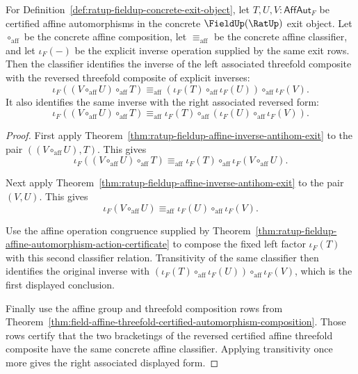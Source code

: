 \begin{theorem}
\label{thm:ratup-fieldup-affine-threefold-inverse-antihom-exit}
For Definition~\ref{def:ratup-fieldup-concrete-exit-object}, let
$T,U,V:\mathsf{AffAut}_F$ be certified affine automorphisms in the concrete
$\FieldUp(\RatUp)$ exit object. Let $\circ_{\mathrm{aff}}$ be the concrete
affine composition, let $\equiv_{\mathrm{aff}}$ be the concrete affine
classifier, and let $\iota_F(-)$ be the explicit inverse operation supplied by
the same exit rows. Then the classifier identifies the inverse of the left
associated threefold composite with the reversed threefold composite of
explicit inverses:
$$
\iota_F((V\circ_{\mathrm{aff}}U)\circ_{\mathrm{aff}}T)
\equiv_{\mathrm{aff}}
(\iota_F(T)\circ_{\mathrm{aff}}\iota_F(U))
\circ_{\mathrm{aff}}\iota_F(V).
$$
It also identifies the same inverse with the right associated reversed form:
$$
\iota_F((V\circ_{\mathrm{aff}}U)\circ_{\mathrm{aff}}T)
\equiv_{\mathrm{aff}}
\iota_F(T)\circ_{\mathrm{aff}}
(\iota_F(U)\circ_{\mathrm{aff}}\iota_F(V)).
$$
\end{theorem}
\begin{proof}
First apply Theorem~\ref{thm:ratup-fieldup-affine-inverse-antihom-exit} to the
pair $((V\circ_{\mathrm{aff}}U),T)$. This gives
$$
\iota_F((V\circ_{\mathrm{aff}}U)\circ_{\mathrm{aff}}T)
\equiv_{\mathrm{aff}}
\iota_F(T)\circ_{\mathrm{aff}}\iota_F(V\circ_{\mathrm{aff}}U).
$$

Next apply Theorem~\ref{thm:ratup-fieldup-affine-inverse-antihom-exit} to the
pair $(V,U)$. This gives
$$
\iota_F(V\circ_{\mathrm{aff}}U)\equiv_{\mathrm{aff}}
\iota_F(U)\circ_{\mathrm{aff}}\iota_F(V).
$$

Use the affine operation congruence supplied by
Theorem~\ref{thm:ratup-fieldup-affine-automorphism-action-certificate} to
compose the fixed left factor $\iota_F(T)$ with this second classifier
relation. Transitivity of the same classifier then identifies the original
inverse with
$(\iota_F(T)\circ_{\mathrm{aff}}\iota_F(U))\circ_{\mathrm{aff}}\iota_F(V)$,
which is the first displayed conclusion.

Finally use the affine group and threefold composition rows from
Theorem~\ref{thm:field-affine-threefold-certified-automorphism-composition}.
Those rows certify that the two bracketings of the reversed certified affine
threefold composite have the same concrete affine classifier. Applying
transitivity once more gives the right associated displayed form.
\end{proof}

